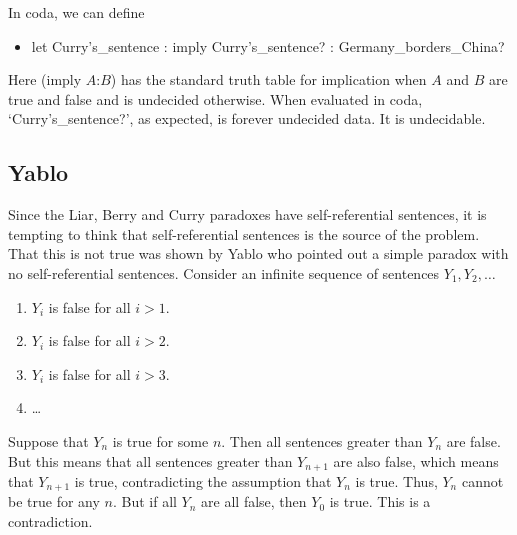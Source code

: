 \documentclass[11pt]{article}
\begin{document}
In coda, we can define
\begin{itemize}
\item let Curry's\_sentence : imply Curry's\_sentence? : Germany\_borders\_China?
\end{itemize}
Here (imply $A$:$B$) has the standard truth table for implication when $A$ and $B$ are true and false and
is undecided otherwise.  When evaluated in coda, `Curry's\_sentence?', as expected, is forever undecided data.  It is undecidable.

\subsection{Yablo}

     Since the Liar, Berry and Curry paradoxes have self-referential sentences, it is tempting to think
that self-referential sentences is the source of the problem.  That this is not true was shown by Yablo\cite{Yablo} who
pointed out a simple paradox with no self-referential sentences.  Consider an infinite sequence
of sentences $Y_1,Y_2,\dots$ 
\begin{enumerate}
\item $Y_i$ is false for all $i>1$.
\item $Y_i$ is false for all $i>2$.
\item $Y_i$ is false for all $i>3$.
\item \dots
\end{enumerate}
Suppose that $Y_n$ is true for some $n$.  Then all sentences greater than $Y_n$ are false.  But this means
that all sentences greater than $Y_{n+1}$ are also false, which means that $Y_{n+1}$ is true, contradicting
the assumption that $Y_n$ is true.  Thus, $Y_n$ cannot be true for any $n$.  But if all $Y_n$ are all false, then
$Y_0$ is true.  This is a contradiction.
\end{document}
